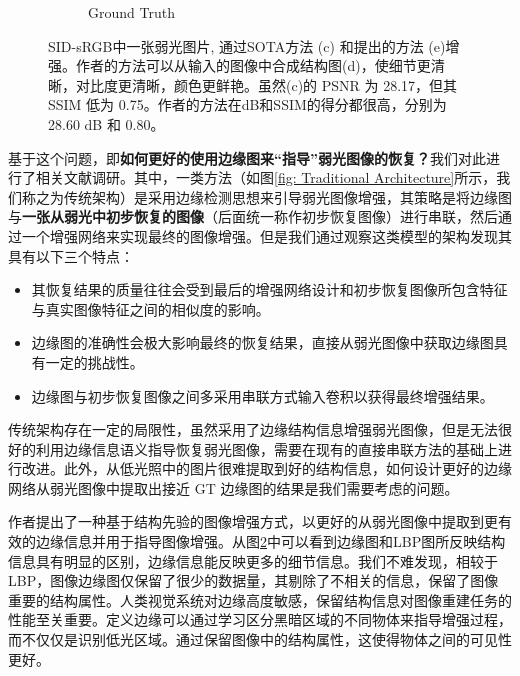 \documentclass[a4paper]{ctexart}
\begin{document}
\begin{figure}[htb]
\begin{subfigure}{0.25\columnwidth}
			\captionsetup{font=scriptsize}
			\caption{Ground Truth}
			\label{fig: Ground Truth}
		\end{subfigure}
		\caption{
			\label{fig: Structural Information}
			SID-sRGB\cite{chen2018learning}中一张弱光图片, 通过SOTA方法 (c) 和\cite{xu2023low}提出的方法 (e)增强。作者的方法可以从输入的图像中合成结构图(d)，使细节更清晰，对比度更清晰，颜色更鲜艳。虽然(c)的 PSNR 为 28.17，但其 SSIM 低为 0.75。作者的方法在dB和SSIM\cite{wang2004image}的得分都很高，分别为28.60 dB 和 0.80。
		}
	\end{figure}
	
	基于这个问题，即\textbf{如何更好的使用边缘图来“指导”弱光图像的恢复？}我们对此进行了相关文献调研。其中，一类方法（如图\ref{fig: Traditional Architecture}所示，我们称之为传统架构）是采用边缘检测思想来引导弱光图像增强，其策略是将边缘图与\textbf{一张从弱光中初步恢复的图像}（后面统一称作初步恢复图像）进行串联，然后通过一个增强网络来实现最终的图像增强\cite{zhu2020eemefn, rana2021edge}。但是我们通过观察这类模型的架构发现其具有以下三个特点：
	
	\begin{itemize}
		\item [(1)] 其恢复结果的质量往往会受到最后的增强网络设计和初步恢复图像所包含特征与真实图像特征之间的相似度的影响。
		
		\item [(2)] 边缘图的准确性会极大影响最终的恢复结果，直接从弱光图像中获取边缘图具有一定的挑战性。
		
		\item [(3)] 边缘图与初步恢复图像之间多采用串联方式输入卷积以获得最终增强结果。
	\end{itemize}
	
	传统架构存在一定的局限性，虽然采用了边缘结构信息增强弱光图像，但是无法很好的利用边缘信息语义指导恢复弱光图像，需要在现有的直接串联方法的基础上进行改进。此外，从低光照中的图片很难提取到好的结构信息，如何设计更好的边缘网络从弱光图像中提取出接近 GT 边缘图的结果是我们需要考虑的问题。
	
	作者\cite{xu2023low}提出了一种基于结构先验的图像增强方式，以更好的从弱光图像中提取到更有效的边缘信息并用于指导图像增强。从图\ref{fig: Structural Information}中可以看到边缘图和LBP图\cite{pietikainen2010local}所反映结构信息具有明显的区别，边缘信息能反映更多的细节信息。我们不难发现，相较于LBP，图像边缘图仅保留了很少的数据量，其剔除了不相关的信息，保留了图像重要的结构属性。人类视觉系统对边缘高度敏感，保留结构信息对图像重建任务的性能至关重要。定义边缘可以通过学习区分黑暗区域的不同物体来指导增强过程，而不仅仅是识别低光区域。通过保留图像中的结构属性，这使得物体之间的可见性更好。
	
\end{document}
